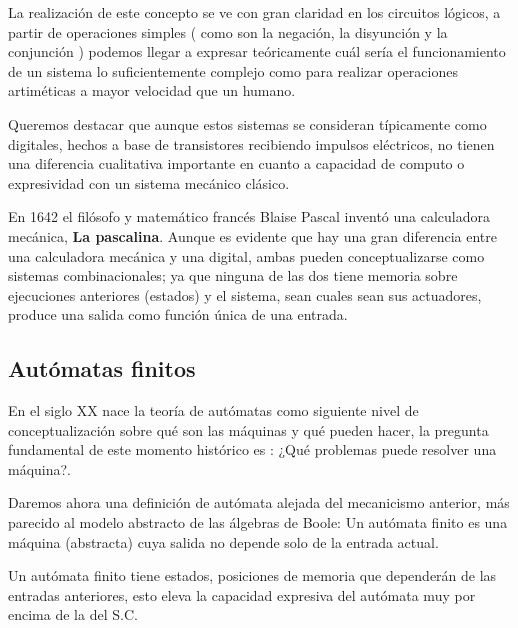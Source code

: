 \vspace{10px}


La realización de este concepto se ve con gran claridad en los circuitos lógicos, a partir de operaciones simples ( como son la negación, la disyunción y la conjunción ) podemos llegar a expresar teóricamente cuál sería el funcionamiento de un sistema lo suficientemente complejo como para realizar operaciones artiméticas a mayor velocidad que un humano.

\vspace{10px}

Queremos destacar que aunque estos sistemas se consideran típicamente como digitales, hechos a base de transistores recibiendo impulsos eléctricos, no tienen una diferencia cualitativa importante en cuanto a capacidad de computo o expresividad con un sistema mecánico clásico.

\vspace{10px}

En 1642 el filósofo y matemático francés Blaise Pascal inventó una calculadora mecánica, \textbf{La pascalina}. Aunque es evidente que hay una gran diferencia entre una calculadora mecánica y una digital, ambas pueden conceptualizarse como sistemas combinacionales; ya que ninguna de las dos tiene memoria sobre ejecuciones anteriores (estados) y el sistema, sean cuales sean sus actuadores, produce una salida como función única de una entrada. 


\subsection{Autómatas finitos}


En el siglo XX nace la teoría de autómatas como siguiente nivel de conceptualización sobre qué son las máquinas y qué pueden hacer, la pregunta fundamental de este momento histórico es : ¿Qué problemas puede resolver una máquina?.

\vspace{10px}

Daremos ahora una definición de autómata alejada del mecanicismo anterior, más parecido al modelo abstracto de las álgebras de Boole: Un autómata finito es una máquina (abstracta) cuya salida no depende solo de la entrada actual.

\vspace{10px}

Un autómata finito tiene estados, posiciones de memoria que dependerán de las entradas anteriores, esto eleva la capacidad expresiva del autómata muy por encima de la del S.C. \\

